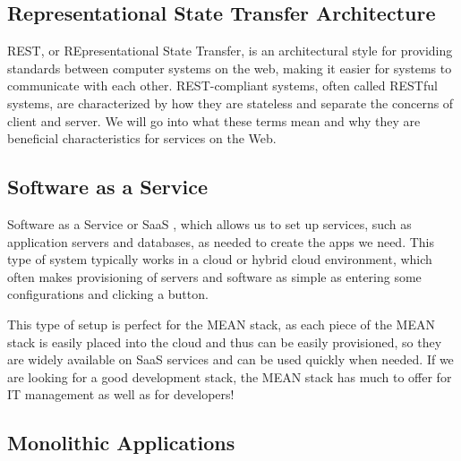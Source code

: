 \subsection{Representational State Transfer Architecture}
REST, or REpresentational State Transfer, is an architectural style for providing standards between computer systems on the web, making it easier for systems to communicate with each other. REST-compliant systems, often called RESTful systems, are characterized by how they are stateless and separate the concerns of client and server. We will go into what these terms mean and why they are beneficial characteristics for services on the Web.
\subsection{Software as a Service}
Software as a Service or SaaS , which allows us to set up services, such as application servers and databases, as needed to create the apps we need. This type of system typically works in a cloud or hybrid cloud environment, which often makes provisioning of servers and software as simple as entering some configurations and clicking a button.

This type of setup is perfect for the MEAN stack, as each piece of the MEAN stack is easily placed into the cloud and thus can be easily provisioned, so they are widely available on SaaS services and can be used quickly when needed. If we are looking for a good development stack, the MEAN stack has much to offer for IT management as well as for developers!

\subsection{Monolithic Applications}

